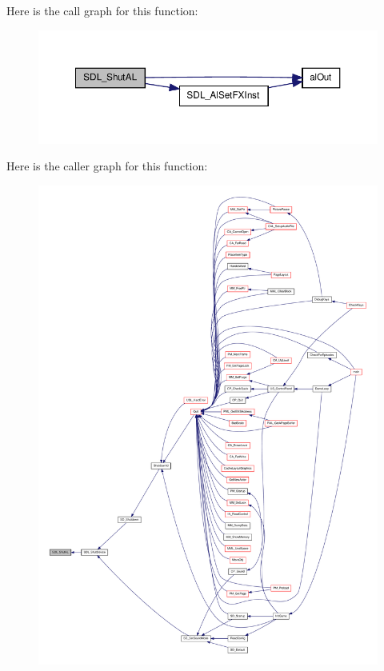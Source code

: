 Here is the call graph for this function:
\nopagebreak
\begin{figure}[H]
\begin{center}
\leavevmode
\includegraphics[width=362pt]{ID__SD_8C_a51fac7990ca45eb8b7f395f27fb11f7b_cgraph}
\end{center}
\end{figure}




Here is the caller graph for this function:
\nopagebreak
\begin{figure}[H]
\begin{center}
\leavevmode
\includegraphics[width=400pt]{ID__SD_8C_a51fac7990ca45eb8b7f395f27fb11f7b_icgraph}
\end{center}
\end{figure}


